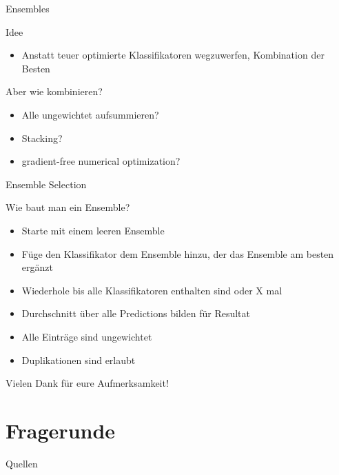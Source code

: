\documentclass{beamer}
\begin{document}
	\begin{frame}{Ensembles}
		\begin{alertblock}{Idee}
			\begin{itemize}
				\item Anstatt teuer optimierte Klassifikatoren wegzuwerfen, Kombination der Besten
			\end{itemize}
		\end{alertblock}
		\pause
		\alert{Aber wie kombinieren?}
		\begin{itemize}
			\item Alle ungewichtet aufsummieren?
			\item Stacking?
			\item gradient-free numerical optimization?
		\end{itemize}
	\end{frame}
	
	\begin{frame}{Ensemble Selection}
		\begin{alertblock}{Wie baut man ein Ensemble?}
			\begin{itemize}
				\item Starte mit einem leeren Ensemble
				\item Füge den Klassifikator dem Ensemble hinzu, der das Ensemble am besten ergänzt
				\item Wiederhole bis alle Klassifikatoren enthalten sind oder X mal
				\item Durchschnitt über alle Predictions bilden für Resultat
				\pause
				\item Alle Einträge sind ungewichtet
				\item Duplikationen sind erlaubt
			\end{itemize}
	\end{alertblock}
	\end{frame}
	
	
	\begin{frame}{}
			Vielen Dank für eure Aufmerksamkeit!
	\end{frame}
	
	\section{Fragerunde}%
	
	\begin{frame}{Quellen}
		
		
	\end{frame}
	
\end{document}
